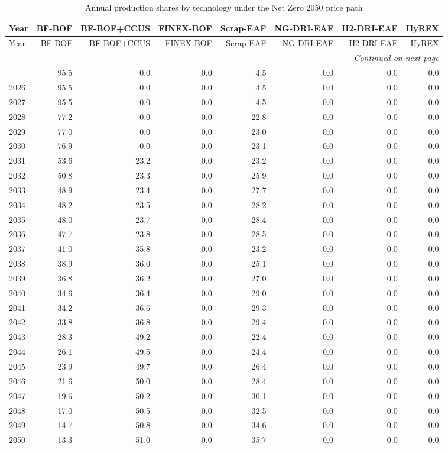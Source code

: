\begin{longtable}{@{}lrrrrrrr@{}}
\caption{Annual production shares by technology under the Net Zero 2050 price path}
\label{tab:annual-shares-ngfs_netzero2050} \\
\toprule
Year & BF-BOF & BF-BOF+CCUS & FINEX-BOF & Scrap-EAF & NG-DRI-EAF & H2-DRI-EAF & HyREX \\
\midrule
\endfirsthead
\toprule
Year & BF-BOF & BF-BOF+CCUS & FINEX-BOF & Scrap-EAF & NG-DRI-EAF & H2-DRI-EAF & HyREX \\
\midrule
\endhead
\bottomrule \multicolumn{8}{r}{\textit{Continued on next page}} \\
\endfoot
\bottomrule
\endlastfoot
2025 & 95.5 & 0.0 & 0.0 & 4.5 & 0.0 & 0.0 & 0.0 \\
2026 & 95.5 & 0.0 & 0.0 & 4.5 & 0.0 & 0.0 & 0.0 \\
2027 & 95.5 & 0.0 & 0.0 & 4.5 & 0.0 & 0.0 & 0.0 \\
2028 & 77.2 & 0.0 & 0.0 & 22.8 & 0.0 & 0.0 & 0.0 \\
2029 & 77.0 & 0.0 & 0.0 & 23.0 & 0.0 & 0.0 & 0.0 \\
2030 & 76.9 & 0.0 & 0.0 & 23.1 & 0.0 & 0.0 & 0.0 \\
2031 & 53.6 & 23.2 & 0.0 & 23.2 & 0.0 & 0.0 & 0.0 \\
2032 & 50.8 & 23.3 & 0.0 & 25.9 & 0.0 & 0.0 & 0.0 \\
2033 & 48.9 & 23.4 & 0.0 & 27.7 & 0.0 & 0.0 & 0.0 \\
2034 & 48.2 & 23.5 & 0.0 & 28.2 & 0.0 & 0.0 & 0.0 \\
2035 & 48.0 & 23.7 & 0.0 & 28.4 & 0.0 & 0.0 & 0.0 \\
2036 & 47.7 & 23.8 & 0.0 & 28.5 & 0.0 & 0.0 & 0.0 \\
2037 & 41.0 & 35.8 & 0.0 & 23.2 & 0.0 & 0.0 & 0.0 \\
2038 & 38.9 & 36.0 & 0.0 & 25.1 & 0.0 & 0.0 & 0.0 \\
2039 & 36.8 & 36.2 & 0.0 & 27.0 & 0.0 & 0.0 & 0.0 \\
2040 & 34.6 & 36.4 & 0.0 & 29.0 & 0.0 & 0.0 & 0.0 \\
2041 & 34.2 & 36.6 & 0.0 & 29.3 & 0.0 & 0.0 & 0.0 \\
2042 & 33.8 & 36.8 & 0.0 & 29.4 & 0.0 & 0.0 & 0.0 \\
2043 & 28.3 & 49.2 & 0.0 & 22.4 & 0.0 & 0.0 & 0.0 \\
2044 & 26.1 & 49.5 & 0.0 & 24.4 & 0.0 & 0.0 & 0.0 \\
2045 & 23.9 & 49.7 & 0.0 & 26.4 & 0.0 & 0.0 & 0.0 \\
2046 & 21.6 & 50.0 & 0.0 & 28.4 & 0.0 & 0.0 & 0.0 \\
2047 & 19.6 & 50.2 & 0.0 & 30.1 & 0.0 & 0.0 & 0.0 \\
2048 & 17.0 & 50.5 & 0.0 & 32.5 & 0.0 & 0.0 & 0.0 \\
2049 & 14.7 & 50.8 & 0.0 & 34.6 & 0.0 & 0.0 & 0.0 \\
2050 & 13.3 & 51.0 & 0.0 & 35.7 & 0.0 & 0.0 & 0.0 \\
\end{longtable}

